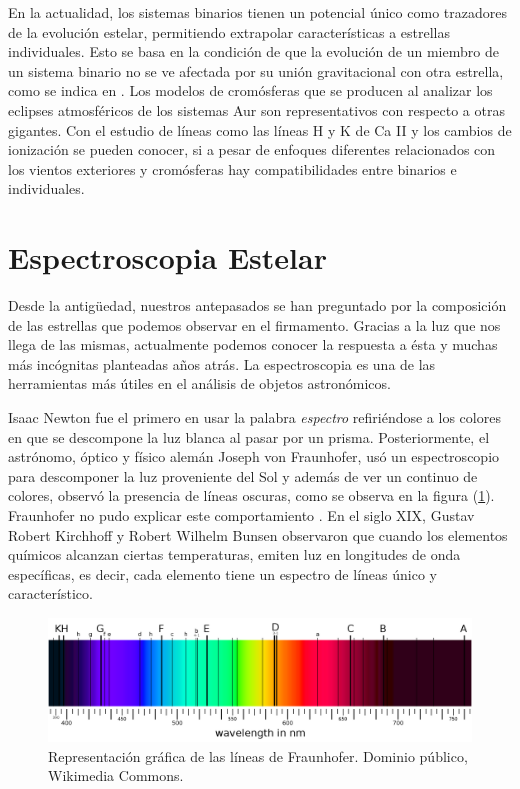 \documentclass[12pt,oneside,openany,letter]{book}
\begin{document}
\noindent En la actualidad, los sistemas binarios tienen un potencial único como trazadores de la evolución estelar, permitiendo extrapolar características a estrellas individuales. Esto se basa en la condición de que la evolución de un miembro de un sistema binario no se ve afectada por su unión gravitacional con otra estrella, como se indica en \citep{schroder1997critical}. Los modelos de cromósferas que se producen al analizar los eclipses atmosféricos de los sistemas Aur son representativos con respecto a otras gigantes. Con el estudio de líneas como las líneas H y K de Ca II y los cambios de ionización se pueden conocer, si a pesar de enfoques diferentes relacionados con los vientos exteriores y cromósferas hay compatibilidades entre binarios e individuales.




\section{Espectroscopia Estelar}\label{espectroscopia}

\noindent Desde la antigüedad, nuestros antepasados se han preguntado por la composición de las estrellas que podemos observar en el firmamento. Gracias a la luz que nos llega de las mismas, actualmente podemos conocer la respuesta a ésta y muchas más incógnitas planteadas años atrás. La espectroscopia es una de las herramientas más útiles en el análisis de objetos astronómicos.
\vspace{2mm}

\noindent Isaac Newton fue el primero en usar la palabra \textit{espectro} refiriéndose a los colores en que se descompone la luz blanca al pasar por un prisma. Posteriormente, el astrónomo, óptico y físico alemán Joseph von Fraunhofer, usó un espectroscopio para descomponer la luz proveniente del Sol y además de ver un continuo de colores, observó la presencia de líneas oscuras, como se observa en la figura (\ref{espectro_frauhofer}). Fraunhofer no pudo explicar este comportamiento \citep{von1823denkschriften}. En el siglo XIX, Gustav Robert Kirchhoff y Robert Wilhelm Bunsen observaron que cuando los elementos químicos alcanzan ciertas temperaturas, emiten luz en longitudes de onda específicas, es decir, cada elemento tiene un espectro de líneas único y característico.

\begin{figure}[h]
    \centering
    \includegraphics[width=1\linewidth]{Images/espectro_fraunhofer.png}
    \caption{Representación gráfica de las líneas de Fraunhofer. Dominio público, Wikimedia Commons.}
    \label{espectro_frauhofer}
\end{figure}
\end{document}

